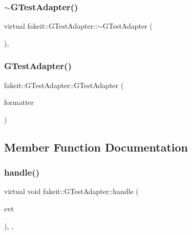 \subsubsection{\texorpdfstring{$\sim$GTestAdapter()}{~GTestAdapter()}\hspace{0.1cm}{\footnotesize\ttfamily [2/2]}}
{\footnotesize\ttfamily virtual fakeit\+::\+G\+Test\+Adapter\+::$\sim$\+G\+Test\+Adapter (\begin{DoxyParamCaption}{ }\end{DoxyParamCaption})\hspace{0.3cm}{\ttfamily [virtual]}, {\ttfamily [default]}}

\mbox{\label{structfakeit_1_1GTestAdapter_a4aa0999134883c0002463e4976d466fb}} 
\subsubsection{\texorpdfstring{GTestAdapter()}{GTestAdapter()}\hspace{0.1cm}{\footnotesize\ttfamily [2/2]}}
{\footnotesize\ttfamily fakeit\+::\+G\+Test\+Adapter\+::\+G\+Test\+Adapter (\begin{DoxyParamCaption}\item[{\mbox{\hyperlink{structfakeit_1_1EventFormatter}{Event\+Formatter}} \&}]{formatter }\end{DoxyParamCaption})\hspace{0.3cm}{\ttfamily [inline]}}



\subsection{Member Function Documentation}
\mbox{\label{structfakeit_1_1GTestAdapter_a68bb18a833f63973f09d12597deb1cf7}} 
\subsubsection{\texorpdfstring{handle()}{handle()}\hspace{0.1cm}{\footnotesize\ttfamily [1/6]}}
{\footnotesize\ttfamily virtual void fakeit\+::\+G\+Test\+Adapter\+::handle (\begin{DoxyParamCaption}\item[{const \mbox{\hyperlink{structfakeit_1_1UnexpectedMethodCallEvent}{Unexpected\+Method\+Call\+Event}} \&}]{evt }\end{DoxyParamCaption})\hspace{0.3cm}{\ttfamily [inline]}, {\ttfamily [override]}, {\ttfamily [virtual]}}



